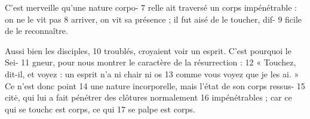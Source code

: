 C'est merveille qu'une nature corpo-	 
7	 	relle ait traversé un corps impénétrable : on ne le vit pas	 
8	 	arriver, on vit sa présence ; il fut aisé de le toucher, dif-	 
9	 	ficile de le reconnaître.

Aussi bien les disciples,	 
10	 	troublés, croyaient voir un esprit. C'est pourquoi le Sei-	 
11	 	gneur, pour nous montrer le caractère de la résurrection :	 
12	 	« Touchez, dit-il, et voyez : un esprit n'a ni chair ni os	 
13	 	comme vous voyez que je les ai. » Ce n'est donc point	 
14	 	une nature incorporelle, mais l'état de son corps ressus-	 
15	 	citė, qui lui a fait pénétrer des clôtures normalement	 
16	 	impénétrables ; car ce qui se touchc est corps, ce qui	 
17	 	se palpe est corps.

